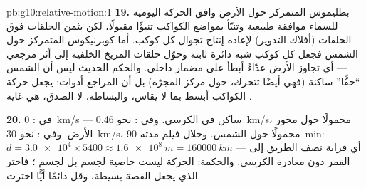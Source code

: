\begin{solution}{pb:g10:relative-motion:1}
\textbf{19.}  بطليموس المتمركز حول الأرض وافق الحركة اليومية
للسماء موافقة طبيعية وتنبّأ بمواضع الكواكب تنبؤًا مقبولًا، لكن
بثمن الحلقات فوق الحلقات (أفلاك التدوير) لإعادة إنتاج تجوال كل
كوكب. أما  كوبرنيكوس المتمركز حول الشمس فجعل كل كوكب
شبه دائرة ثابتة وحوّل حلقات المريخ الخلفية إلى أثر
مرجعي --- أي تجاوز الأرض عدّاءً أبطأ على مضمار داخلي. والحكم
الحديث ليس أن الشمس ``حقًّا'' ساكنة (فهي أيضًا
تتحرك، حول مركز المجرّة) بل أن المراجع أدوات:
 يجعل حركة الكواكب أبسط بما لا يقاس،
والبساطة، لا الصدق، هي غاية .

\textbf{20.} في : \qty{0}{km/s} --- ساكن في الكرسي.
وفي : نحو \qty{0.46}{km/s}، محمولًا حول محور
الأرض. وفي : نحو \qty{30}{km/s}، محمولًا حول الشمس.
وخلال فيلم مدته \qty{90}{min}: $d = \num{3.0e4} \times 5400
\approx \qty{1.6e8}{m} = \qty{160000}{km}$ --- أي قرابة نصف الطريق إلى
القمر دون مغادرة الكرسي. والحكمة: الحركة ليست خاصية
لجسم بل لجسم ؛ فاختر  الذي يجعل القصة
بسيطة، وقل دائمًا أيًّا اخترت.
\end{solution}
